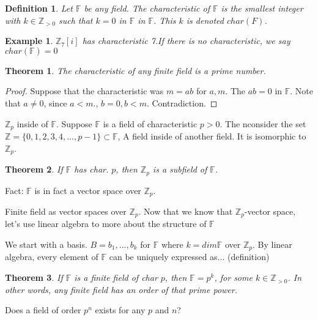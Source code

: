 \documentclass{article}
\newtheorem{thm}{Theorem}
\newtheorem{defn}{Definition}
\newtheorem{eg}{Example}
\begin{document}
\begin{defn}
    Let $\mathbb{F}$ be any field. The characteristic of $\mathbb{F}$  is the smallest
    integer with $k\in\mathbb{Z}_{> 0}$ such that $k=0$ in $\mathbb{F}$ in $\mathbb{F}$.
    This $k$ is denoted $char(F)$.
\end{defn}

\begin{eg}
   $\mathbb{Z}_7[i]$ has characteristic 7.If there is no characteristic, we say
    $char(\mathbb{F}) = 0$
\end{eg}

\begin{thm}
    The characteristic of any finite field is a prime number.
\end{thm}

\begin{proof}
    Suppose that the characteristic was $m=ab$ for $a, m$.
    The $ab = 0$ in $\mathbb{F}$. Note that $a\ne 0$, since $a<m$.,
    $b = 0, b < m$.  Contradiction.
\end{proof}

$\mathbb{Z}_p$ inside of $\mathbb{F}$. Suppose $\mathbb{F}$ is a field of
characteristic $p>0$. The nconsider the set $\mathbb{Z} = \{0,1,2,3,4, ..., p-1\} \subset{\mathbb{F}}$,
A field inside of another field. It is isomorphic to $\mathbb{Z}_p$.

\begin{thm}
    If $\mathbb{F}$ has char. $p$, then $\mathbb{Z}_p$ is a subfield of $\mathbb{F}$.
\end{thm}

Fact: $\mathbb{F}$ is in fact a vector space over $\mathbb{Z}_p$.

Finite field as vector spaces over $\mathbb{Z}_p$. Now that we know that
$\mathbb{Z}_p$-vector space, let's use linear algebra to more about
the structure of $\mathbb{F}$

We start with a basis. $B = {b_1, ..., b_k}$ for $\mathbb{F}$ where
$k = dim \mathbb{F}$ over $\mathbb{Z}_p$. By linear algebra, every element of
$\mathbb{F}$ can be uniquely expressed as... (definition)

\begin{thm}
    If $\mathbb{F}$ is a finite field of char $p$, then $\mathbb{F} = p^k$, for
    some $k\in\mathbb{Z}_{> 0}$. In other words, any finite field has an order of that
    prime power.
\end{thm}


Does a field of order $p^n$ exists for any $p$ and $n$?
\end{document}
